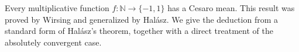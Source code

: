 Every multiplicative function $f:\mathbb N\to\{-1,1\}$ has a
Cesaro mean. This result was proved by Wirsing and generalized
by Hal\'asz. We give the deduction from a standard form of
Hal\'asz's theorem, together with a direct treatment of the
absolutely convergent case.
